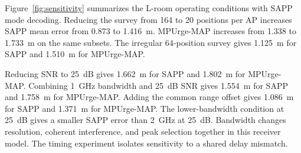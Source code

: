 Figure~\ref{fig:sensitivity} summarizes the L-room operating conditions with SAPP mode decoding. Reducing the survey from 164 to 20 positions per AP increases SAPP mean error from 0.873 to 1.416~m. MPUrge-MAP increases from 1.338 to 1.733~m on the same subsets. The irregular 64-position survey gives 1.125~m for SAPP and 1.510~m for MPUrge-MAP.

Reducing SNR to 25~dB gives 1.662~m for SAPP and 1.802~m for MPUrge-MAP. Combining 1~GHz bandwidth and 25~dB SNR gives 1.554~m for SAPP and 1.758~m for MPUrge-MAP. Adding the common range offset gives 1.086~m for SAPP and 1.371~m for MPUrge-MAP. The lower-bandwidth condition at 25~dB gives a smaller SAPP error than 2~GHz at 25~dB. Bandwidth changes resolution, coherent interference, and peak selection together in this receiver model. The timing experiment isolates sensitivity to a shared delay mismatch.
